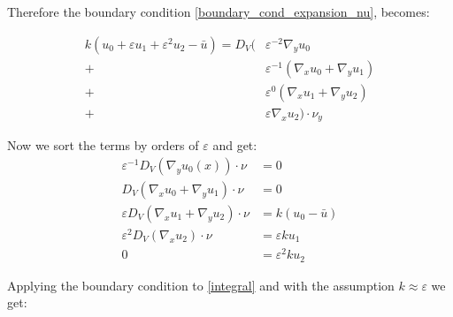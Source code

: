 \documentclass[10pt, a4paper]{article}
\begin{document}
Therefore the boundary condition \eqref{boundary_cond_expansion_nu}, becomes:

 \begin{align}
 \label{boundary_cond_expansion_nu_y}
k(u_0 + \varepsilon u_1 + \varepsilon^2 u_2 - \bar{u}) = D_V(&\varepsilon^{-2} \nabla_y u_0 \\ \nonumber
+& \varepsilon^{-1}(\nabla_x u_0 + \nabla_y u_1)\\
+& \varepsilon^0 ( \nabla_x u_1 + \nabla_y u_2)\\ \nonumber
+& \varepsilon \nabla_x u_2) \cdot \nu_y \nonumber
\end{align}

Now we sort the terms by orders of $\varepsilon$ and get:
\begin{align}
 \varepsilon^{-1}D_V(\nabla_y u_0(x)) \cdot \nu &= 0\\ \nonumber
  D_V(\nabla_x u_0 + \nabla_y u_1) \cdot \nu &= 0\\
   \varepsilon D_V(\nabla_x u_1 + \nabla_y u_2) \cdot \nu&= k(u_0- \bar{u}) \\ \nonumber
   \varepsilon^2 D_V(\nabla_x u_2) \cdot \nu &= \varepsilon k u_1 \\ \nonumber
   0 &= \varepsilon^2 k u_2
\end{align}

Applying the boundary condition to \eqref{integral} and with the assumption $k \approx \varepsilon$ we get:
\end{document}

